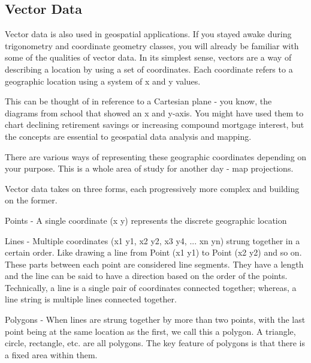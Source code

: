 \subsection{Vector Data}
Vector data is also used in geospatial applications. If you stayed awake
during trigonometry and coordinate geometry classes, you will already be
familiar with some of the qualities of vector data. In its simplest sense,
vectors are a way of describing a location by using a set of coordinates. Each
coordinate refers to a geographic location using a system of x and y values.

This can be thought of in reference to a Cartesian plane - you know, the
diagrams from school that showed an x and y-axis. You might have used them to
chart declining retirement savings or increasing compound mortgage interest,
but the concepts are essential to geospatial data analysis and mapping.

There are various ways of representing these geographic coordinates depending
on your purpose. This is a whole area of study for another day - map
projections.

Vector data takes on three forms, each progressively more complex and building
on the former.  
\begin{compactenum}
\item Points - A single coordinate (x y) represents the discrete geographic location
\item Lines - Multiple coordinates (x1 y1, x2 y2, x3 y4, ... xn yn) strung
together in a certain order. Like drawing a line from Point (x1 y1) to Point
(x2 y2) and so on. These parts between each point are considered line
segments. They have a length and the line can be said to have a direction
based on the order of the points. Technically, a line is a single pair of
coordinates connected together; whereas, a line string is multiple lines
connected together.  
\item Polygons - When lines are strung together by more
than two points, with the last point being at the same location as the first,
we call this a polygon. A triangle, circle, rectangle, etc. are all polygons.
The key feature of polygons is that there is a fixed area within them.
\end{compactenum}

